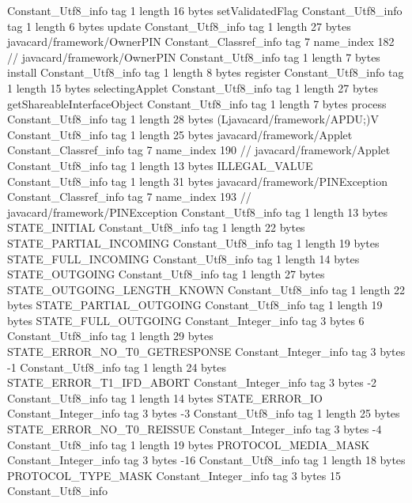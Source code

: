 {{{		}
		Constant_Utf8_info {
			tag	1
			length	16
			bytes	setValidatedFlag
		}
		Constant_Utf8_info {
			tag	1
			length	6
			bytes	update
		}
		Constant_Utf8_info {
			tag	1
			length	27
			bytes	javacard/framework/OwnerPIN
		}
		Constant_Classref_info {
			tag	7
			name_index	182		// javacard/framework/OwnerPIN
		}
		Constant_Utf8_info {
			tag	1
			length	7
			bytes	install
		}
		Constant_Utf8_info {
			tag	1
			length	8
			bytes	register
		}
		Constant_Utf8_info {
			tag	1
			length	15
			bytes	selectingApplet
		}
		Constant_Utf8_info {
			tag	1
			length	27
			bytes	getShareableInterfaceObject
		}
		Constant_Utf8_info {
			tag	1
			length	7
			bytes	process
		}
		Constant_Utf8_info {
			tag	1
			length	28
			bytes	(Ljavacard/framework/APDU;)V
		}
		Constant_Utf8_info {
			tag	1
			length	25
			bytes	javacard/framework/Applet
		}
		Constant_Classref_info {
			tag	7
			name_index	190		// javacard/framework/Applet
		}
		Constant_Utf8_info {
			tag	1
			length	13
			bytes	ILLEGAL_VALUE
		}
		Constant_Utf8_info {
			tag	1
			length	31
			bytes	javacard/framework/PINException
		}
		Constant_Classref_info {
			tag	7
			name_index	193		// javacard/framework/PINException
		}
		Constant_Utf8_info {
			tag	1
			length	13
			bytes	STATE_INITIAL
		}
		Constant_Utf8_info {
			tag	1
			length	22
			bytes	STATE_PARTIAL_INCOMING
		}
		Constant_Utf8_info {
			tag	1
			length	19
			bytes	STATE_FULL_INCOMING
		}
		Constant_Utf8_info {
			tag	1
			length	14
			bytes	STATE_OUTGOING
		}
		Constant_Utf8_info {
			tag	1
			length	27
			bytes	STATE_OUTGOING_LENGTH_KNOWN
		}
		Constant_Utf8_info {
			tag	1
			length	22
			bytes	STATE_PARTIAL_OUTGOING
		}
		Constant_Utf8_info {
			tag	1
			length	19
			bytes	STATE_FULL_OUTGOING
		}
		Constant_Integer_info {
			tag	3
			bytes	6
		}
		Constant_Utf8_info {
			tag	1
			length	29
			bytes	STATE_ERROR_NO_T0_GETRESPONSE
		}
		Constant_Integer_info {
			tag	3
			bytes	-1
		}
		Constant_Utf8_info {
			tag	1
			length	24
			bytes	STATE_ERROR_T1_IFD_ABORT
		}
		Constant_Integer_info {
			tag	3
			bytes	-2
		}
		Constant_Utf8_info {
			tag	1
			length	14
			bytes	STATE_ERROR_IO
		}
		Constant_Integer_info {
			tag	3
			bytes	-3
		}
		Constant_Utf8_info {
			tag	1
			length	25
			bytes	STATE_ERROR_NO_T0_REISSUE
		}
		Constant_Integer_info {
			tag	3
			bytes	-4
		}
		Constant_Utf8_info {
			tag	1
			length	19
			bytes	PROTOCOL_MEDIA_MASK
		}
		Constant_Integer_info {
			tag	3
			bytes	-16
		}
		Constant_Utf8_info {
			tag	1
			length	18
			bytes	PROTOCOL_TYPE_MASK
		}
		Constant_Integer_info {
			tag	3
			bytes	15
		}
		Constant_Utf8_info {
}}}
